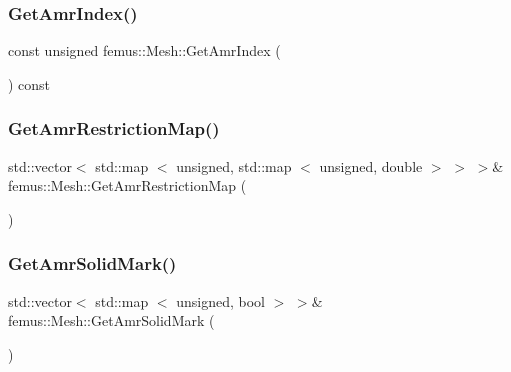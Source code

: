 \subsubsection{\texorpdfstring{Get\+Amr\+Index()}{GetAmrIndex()}}
{\footnotesize\ttfamily const unsigned femus\+::\+Mesh\+::\+Get\+Amr\+Index (\begin{DoxyParamCaption}{ }\end{DoxyParamCaption}) const\hspace{0.3cm}{\ttfamily [inline]}}

\mbox{\label{classfemus_1_1_mesh_af03a43d29cbcddb3d258be21066ce4a0}} 
\subsubsection{\texorpdfstring{Get\+Amr\+Restriction\+Map()}{GetAmrRestrictionMap()}}
{\footnotesize\ttfamily std\+::vector$<$ std\+::map $<$ unsigned, std\+::map $<$ unsigned, double $>$ $>$ $>$\& femus\+::\+Mesh\+::\+Get\+Amr\+Restriction\+Map (\begin{DoxyParamCaption}{ }\end{DoxyParamCaption})\hspace{0.3cm}{\ttfamily [inline]}}

\mbox{\label{classfemus_1_1_mesh_a5d9eb3aa045d016934383711debaa5f5}} 
\subsubsection{\texorpdfstring{Get\+Amr\+Solid\+Mark()}{GetAmrSolidMark()}}
{\footnotesize\ttfamily std\+::vector$<$ std\+::map $<$ unsigned, bool $>$ $>$\& femus\+::\+Mesh\+::\+Get\+Amr\+Solid\+Mark (\begin{DoxyParamCaption}{ }\end{DoxyParamCaption})\hspace{0.3cm}{\ttfamily [inline]}}

\mbox{\label{classfemus_1_1_mesh_a187f3cfb2c0699d8d10935415cc2aafb}} 
